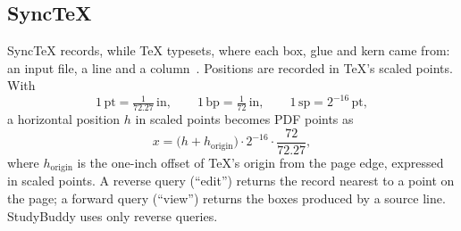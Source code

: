 \subsection{SyncTeX}

SyncTeX records, while \TeX{} typesets, where each box, glue and kern came from:
an input file, a line and a column~\cite{laurens2008}. Positions are recorded
in \TeX{}'s scaled points. With
\begin{equation}
  1\,\mathrm{pt} = \tfrac{1}{72.27}\,\mathrm{in}, \qquad
  1\,\mathrm{bp} = \tfrac{1}{72}\,\mathrm{in}, \qquad
  1\,\mathrm{sp} = 2^{-16}\,\mathrm{pt},
\end{equation}
a horizontal position $h$ in scaled points becomes PDF points as
\begin{equation}
  x = \bigl(h + h_{\text{origin}}\bigr) \cdot 2^{-16} \cdot \frac{72}{72.27},
  \label{eq:sp-to-bp}
\end{equation}
where $h_{\text{origin}}$ is the one-inch offset of \TeX{}'s origin from the
page edge, expressed in scaled points. A reverse query (``edit'') returns the
record nearest to a point on the page; a forward query (``view'') returns the
boxes produced by a source line. StudyBuddy uses only reverse queries.
